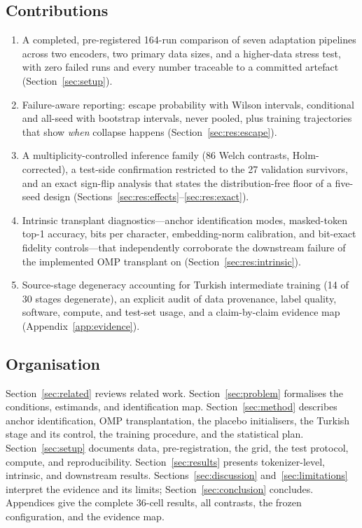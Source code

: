 \subsection{Contributions}
\begin{enumerate}[leftmargin=*,nosep]
  \item A completed, pre-registered 164-run comparison of seven adaptation pipelines across two encoders, two primary data sizes, and a higher-data stress test, with zero failed runs and every number traceable to a committed artefact (Section~\ref{sec:setup}).
  \item Failure-aware reporting: escape probability with Wilson intervals, conditional and all-seed \Fone{} with bootstrap intervals, never pooled, plus training trajectories that show \emph{when} collapse happens (Section~\ref{sec:res:escape}).
  \item A multiplicity-controlled inference family (86 Welch contrasts, Holm-corrected), a test-side confirmation restricted to the 27 validation survivors, and an exact sign-flip analysis that states the distribution-free floor of a five-seed design (Sections~\ref{sec:res:effects}--\ref{sec:res:exact}).
  \item Intrinsic transplant diagnostics---anchor identification modes, masked-token top-1 accuracy, bits per character, embedding-norm calibration, and bit-exact fidelity controls---that independently corroborate the downstream failure of the implemented OMP transplant on \xlmr{} (Section~\ref{sec:res:intrinsic}).
  \item Source-stage degeneracy accounting for Turkish intermediate training (14 of 30 \xlmxv{} stages degenerate), an explicit audit of data provenance, label quality, software, compute, and test-set usage, and a claim-by-claim evidence map (Appendix~\ref{app:evidence}).
\end{enumerate}

\subsection{Organisation}
Section~\ref{sec:related} reviews related work. Section~\ref{sec:problem} formalises the conditions, estimands, and identification map. Section~\ref{sec:method} describes anchor identification, OMP transplantation, the placebo initialisers, the Turkish stage and its control, the training procedure, and the statistical plan. Section~\ref{sec:setup} documents data, pre-registration, the grid, the test protocol, compute, and reproducibility. Section~\ref{sec:results} presents tokenizer-level, intrinsic, and downstream results. Sections~\ref{sec:discussion} and~\ref{sec:limitations} interpret the evidence and its limits; Section~\ref{sec:conclusion} concludes. Appendices give the complete 36-cell results, all contrasts, the frozen configuration, and the evidence map.
